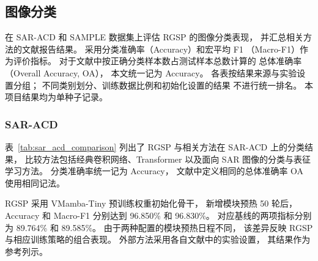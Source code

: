 \FloatBarrier
\subsection{图像分类}
\label{sec:classification_results}

在 SAR-ACD 和 SAMPLE 数据集上评估 RGSP 的图像分类表现，
并汇总相关方法的文献报告结果。
采用分类准确率（Accuracy）和宏平均 F1
（Macro-F1）作为评价指标。
对于文献中按正确分类样本数占测试样本总数计算的
总体准确率（Overall Accuracy, OA），
本文统一记为 Accuracy。
各表按结果来源与实验设置分组；
不同类别划分、训练数据比例和初始化设置的结果
不进行统一排名。
本项目结果均为单种子记录。

\subsubsection{SAR-ACD}
\label{sec:sar_acd_results}

表~\ref{tab:sar_acd_comparison}
列出了 RGSP 与相关方法在 SAR-ACD 上的分类结果，
比较方法包括经典卷积网络、Transformer
以及面向 SAR 图像的分类与表征学习方法。
分类准确率统一记为 Accuracy，
文献中定义相同的总体准确率 OA 使用相同记法。

RGSP 采用 VMamba-Tiny 预训练权重初始化骨干，
新增模块预热 50 轮后，
Accuracy 和 Macro-F1 分别达到
96.850\% 和 96.830\%。
对应基线的两项指标分别为
89.764\% 和 89.585\%。
由于两种配置的模块预热日程不同，
该差异反映 RGSP 与相应训练策略的组合表现。
外部方法采用各自文献中的实验设置，
其结果作为参考列示。

